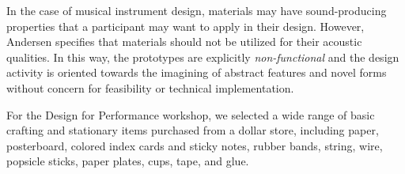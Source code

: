 \documentclass[letterpaper, 12pt]{article}
\begin{document}
In the case of musical instrument design, materials may have sound-producing properties that a participant may want to apply in their design. However, Andersen specifies that materials should not be utilized for their acoustic qualities. In this way, the prototypes are explicitly \emph{non-functional} and the design activity is oriented towards the imagining of abstract features and novel forms without concern for feasibility or technical implementation. 

For the Design for Performance workshop, we selected a wide range of basic crafting and stationary items purchased from a dollar store, including paper, posterboard, colored index cards and sticky notes, rubber bands, string, wire, popsicle sticks, paper plates, cups, tape, and glue. 


\end{document}
